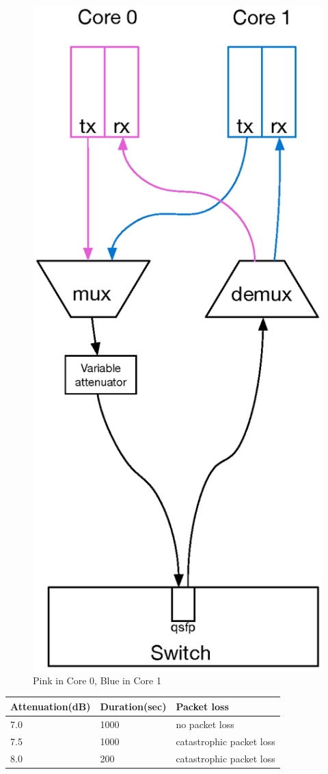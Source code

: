 \documentclass{article}
\begin{document}
{\begin{figure}[h!]
\begin{minipage}{.5\textwidth}
		\includegraphics[width = .6\linewidth]{pinkbluecore1vartxcom.eps}
		\caption{Pink in Core 0, Blue in Core 1}
		\label{fig:pinkcore0}
	\end{minipage}
\end{figure}
\begin{table}[ht]
\begin{minipage}{.5\textwidth}
\begin{center}
\begin{tabular}{|p{2.5cm}|p{2.5cm}|p{2.5cm}|}
	\hline
	 Attenuation(dB) & Duration(sec) & Packet loss \\ \hline
         7.0  & 1000 & no packet loss \\ \hline
	 7.5 & 1000 & catastrophic packet loss \\ \hline
	 8.0  &  200 & catastrophic packet loss \\ \hline
\end{tabular}
\end{center}

\end{minipage}
\end{table}}
\end{document}
